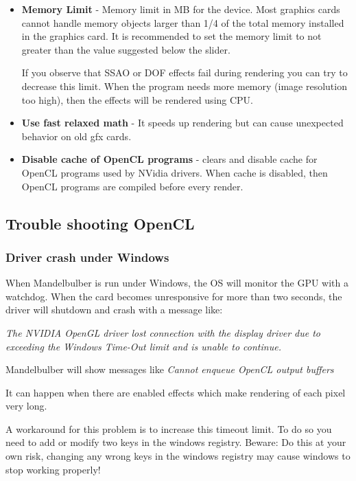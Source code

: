 \begin{itemize}
	\item \textbf{Memory Limit} - Memory limit in MB for the device. Most graphics cards cannot handle memory objects larger than 1/4 of the total memory installed in the graphics card. It is recommended to set the memory limit to not greater than the value suggested below the slider.  
	
	If you observe that SSAO or DOF effects fail during rendering you can try to decrease this limit. When the program needs more memory (image resolution too high), then the effects will be rendered using CPU.
	
	\item \textbf{Use fast relaxed math} - It speeds up rendering but can cause unexpected behavior on old gfx cards.
	 
	\item \textbf{Disable cache of OpenCL programs} - clears and disable cache for OpenCL programs used by NVidia drivers. When cache is disabled, then OpenCL programs are compiled before every render.
\end{itemize}


\subsection{Trouble shooting OpenCL}\label{opencl-troubleshooting}

\subsubsection{Driver crash under Windows}

When Mandelbulber is run under Windows, the OS will monitor the GPU with a watchdog. When the card becomes unresponsive for more than two seconds, the driver will shutdown and crash with a message like:

\emph{The NVIDIA OpenGL driver lost connection with the display driver due to exceeding the Windows Time-Out limit and is unable to continue.}

Mandelbulber will show messages like \emph{Cannot enqueue OpenCL output buffers}

It can happen when there are enabled effects which make rendering of each pixel very long. 

A workaround for this problem is to increase this timeout limit. To do so you need to add or modify two keys in the windows registry. Beware: Do this at your own risk, changing any wrong keys in the windows registry may cause windows to stop working properly!

